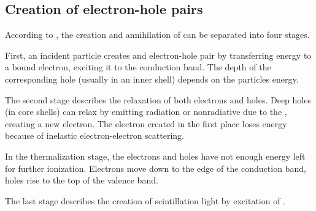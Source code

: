 \subsection{Creation of electron-hole pairs}
According to \cite{rodnyi}, the creation and annihilation of  can be separated into four stages. \par 
First, an incident particle creates and electron-hole pair by transferring energy to a bound electron, exciting it to the conduction band. The depth of the corresponding hole (usually in an inner shell) depends on the particles energy. \par 
The second stage describes the relaxation of both electrons and holes. Deep holes (in core shells) can relax by emitting radiation or nonradiative due to the , creating a new electron. The electron created in the first place loses energy because of inelastic electron-electron scattering. \par 
In the thermalization stage, the electrons and holes have not enough energy left for further ionization. Electrons move down to the edge of the conduction band, holes rise to the top of the valence band. \par 
The last stage describes the creation of scintillation light by excitation of .
